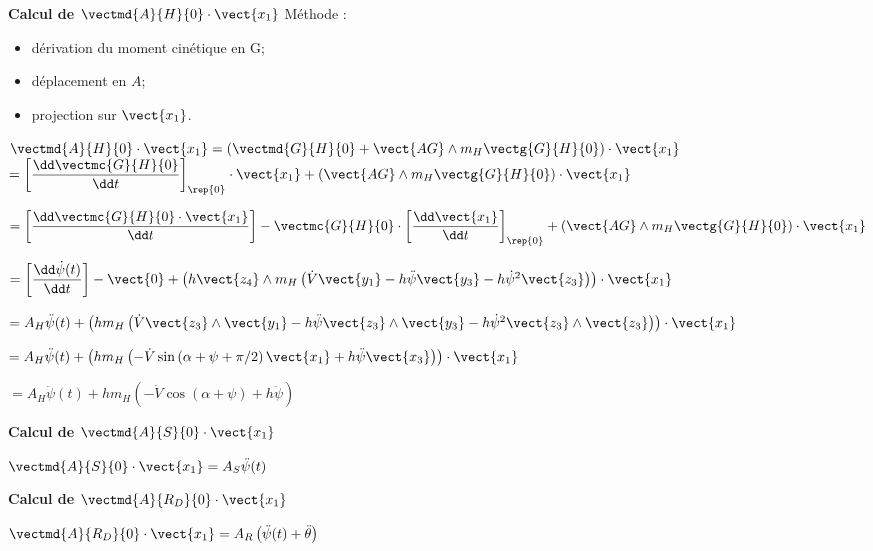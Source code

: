 \ifprof
\begin{corrige}

\textbf{Calcul de $\vectmd{A}{H}{0}\cdot \vect{x_1}$}
Méthode : 
\begin{itemize}
\item dérivation du moment cinétique en G;
\item déplacement en $A$;
\item projection sur $\vect{x_1}$.
\end{itemize}

$\vectmd{A}{H}{0}\cdot \vect{x_1} = \left(\vectmd{G}{H}{0} + \vect{AG}\wedge m_H  \vectg{G}{H}{0} \right)\cdot \vect{x_1}$
$ = \left[\dfrac{\dd \vectmc{G}{H}{0}}{\dd t}\right]_{\rep{0}} \cdot \vect{x_1}+ \left(\vect{AG}\wedge m_H  \vectg{G}{H}{0}\right) \cdot \vect{x_1} $


$ = \left[\dfrac{\dd \vectmc{G}{H}{0}\cdot \vect{x_1}}{\dd t}\right]
- \vectmc{G}{H}{0}\cdot \left[\dfrac{\dd \vect{x_1}}{\dd t}\right]_{\rep{0}}
+ \left(\vect{AG}\wedge m_H  \vectg{G}{H}{0}\right) \cdot \vect{x_1} $

$ = \left[\dfrac{\dd \dot{\psi}(t)}{\dd t}\right]
- \vect{0}
+ \left(h\vect{z_4}\wedge m_H  \left(  \dot{V}\vect{y_1} - h\ddot{\psi} \vect{y_3}- h\dot{\psi}^2 \vect{z_3}\right)\right) \cdot \vect{x_1} $

$ = A_H\ddot{\psi}(t)
+ \left(h m_H  \left(  \dot{V}\vect{z_3}\wedge \vect{y_1} - h\ddot{\psi} \vect{z_3}\wedge\vect{y_3}- h\dot{\psi}^2 \vect{z_3}\wedge \vect{z_3}\right)\right) \cdot \vect{x_1} $

$ =  A_H\ddot{\psi}(t)
+ \left(h m_H  \left(  - \dot{V}\sin\left( \alpha + \psi + \pi/2 \right)  \vect{x_1} + h\ddot{\psi} \vect{x_3} \right)\right) \cdot \vect{x_1} $

$ = A_H\ddot{\psi}(t) + h m_H  \left(  - \dot{V}\cos\left( \alpha + \psi  \right)  + h\ddot{\psi}  \right) $


\textbf{Calcul de $\vectmd{A}{S}{0}\cdot \vect{x_1}$}

$\vectmd{A}{S}{0}\cdot \vect{x_1} = A_S \ddot{\psi}(t) $

\textbf{Calcul de $\vectmd{A}{R_D}{0}\cdot \vect{x_1}$}

$\vectmd{A}{R_D}{0}\cdot \vect{x_1}  =  A_R \left( \ddot{\psi}(t) + \ddot{\theta}\right) $


\end{corrige}
\else
\fi

